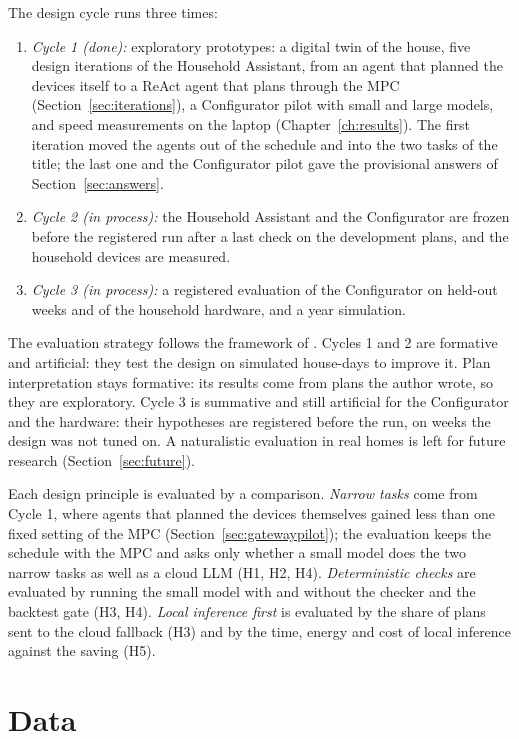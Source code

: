 The design cycle runs three times:

\begin{enumerate}[nosep]
\item \textit{Cycle 1 (done):} exploratory prototypes: a digital twin
of the house, five design iterations of the Household Assistant, from
an agent that planned the devices itself to a ReAct agent that plans
through the MPC (Section~\ref{sec:iterations}), a Configurator pilot
with small and large models, and speed measurements on the laptop
(Chapter~\ref{ch:results}). The first iteration moved the agents out of
the schedule and into the two tasks of the title; the last one and the
Configurator pilot gave the provisional answers of
Section~\ref{sec:answers}.
\item \textit{Cycle 2 (in process):} the Household Assistant and the
Configurator are frozen before the registered run after a last check on
the development plans, and the household devices are measured.
\item \textit{Cycle 3 (in process):} a registered evaluation of the
Configurator on held-out weeks and of the household hardware, and a
year simulation.
\end{enumerate}

The evaluation strategy follows the framework of
\textcite{venable2016}. Cycles 1 and 2 are formative and artificial:
they test the design on simulated house-days to improve it. Plan
interpretation stays formative: its results come from plans the author
wrote, so they are exploratory. Cycle 3 is summative and still
artificial for the Configurator and the hardware: their hypotheses are
registered before the run, on weeks the design was not tuned on. A naturalistic
evaluation in real homes is left for future research
(Section~\ref{sec:future}).

Each design principle is evaluated by a comparison. \textit{Narrow
tasks} come from Cycle 1, where agents that planned the devices
themselves gained less than one fixed setting of the MPC
(Section~\ref{sec:gatewaypilot}); the evaluation keeps the schedule with
the MPC and asks only whether a small model does the two narrow tasks
as well as a cloud LLM (H1, H2, H4). \textit{Deterministic checks} are
evaluated by running the small model with and without the checker and
the backtest gate (H3, H4). \textit{Local inference first} is evaluated
by the share of plans sent to the cloud fallback (H3) and by the time,
energy and cost of local inference against the saving (H5).

\section{Data}
\label{sec:data}

